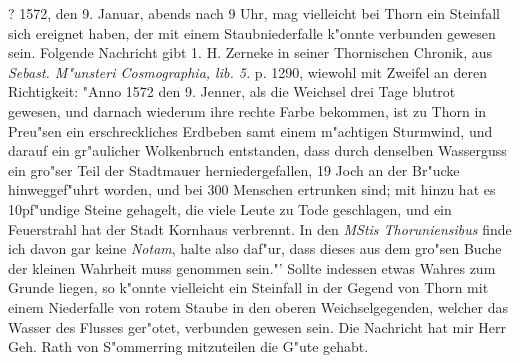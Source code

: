 \documentclass[a4paper, 11pt, oneside, polutonikogreek, german]{article}
\begin{document}
? 1572, den 9. Januar, abends nach 9 Uhr, mag vielleicht bei Thorn ein Steinfall sich ereignet haben, der mit einem Staubniederfalle k"onnte verbunden gewesen sein. Folgende Nachricht gibt 1. H. Zerneke in seiner Thornischen Chronik, aus \emph{Sebast. M"unsteri Cosmographia, lib. 5.} p. 1290, wiewohl mit Zweifel an deren Richtigkeit: "Anno 1572 den 9. Jenner, als die Weichsel drei Tage blutrot gewesen, und darnach wiederum ihre rechte Farbe bekommen, ist zu Thorn in Preu"sen ein erschreckliches Erdbeben samt einem m"achtigen Sturmwind, und darauf ein gr"aulicher Wolkenbruch entstanden, dass durch denselben Wasserguss ein gro"ser Teil der Stadtmauer herniedergefallen, 19 Joch an der Br"ucke hinweggef"uhrt worden, und bei 300 Menschen ertrunken sind; mit hinzu hat es 10pf"undige Steine gehagelt, die viele Leute zu Tode geschlagen, und ein Feuerstrahl hat der Stadt Kornhaus verbrennt. In den \emph{MStis Thoruniensibus} finde ich davon gar keine \emph{Notam}, halte also daf"ur, dass dieses aus dem gro"sen Buche der kleinen Wahrheit muss genommen sein."' Sollte indessen etwas Wahres zum Grunde liegen, so k"onnte vielleicht ein Steinfall in der Gegend von Thorn mit einem Niederfalle von rotem Staube in den oberen Weichselgegenden, welcher das Wasser des Flusses ger"otet, verbunden gewesen sein. Die Nachricht hat mir Herr Geh. Rath von S"ommerring mitzuteilen die G"ute gehabt.
\end{document}
